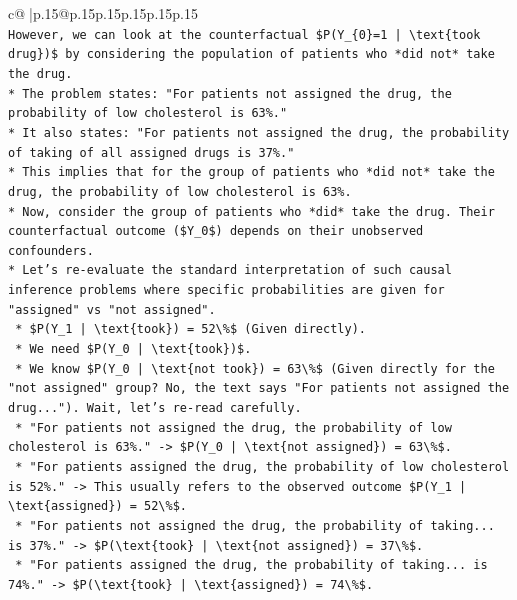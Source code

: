 \documentclass{article}
\begin{document}
{\begin{supertabular}{c@{$\;$}|p{.15\linewidth}@{}p{.15\linewidth}p{.15\linewidth}p{.15\linewidth}p{.15\linewidth}p{.15\linewidth}}
{{{\\ 
\texttt{However, we can look at the counterfactual \$P(Y\_\{0\}=1 | \textbackslash{}text\{took drug\})\$ by considering the population of patients who *did not* take the drug.} \\
\texttt{*   The problem states: "For patients not assigned the drug, the probability of low cholesterol is 63\%."} \\
\texttt{*   It also states: "For patients not assigned the drug, the probability of taking of all assigned drugs is 37\%."} \\
\texttt{*   This implies that for the group of patients who *did not* take the drug, the probability of low cholesterol is 63\%.} \\
\texttt{*   Now, consider the group of patients who *did* take the drug. Their counterfactual outcome (\$Y\_0\$) depends on their unobserved confounders.} \\
\texttt{*   Let's re{-}evaluate the standard interpretation of such causal inference problems where specific probabilities are given for "assigned" vs "not assigned".} \\
\texttt{    *   \$P(Y\_1 | \textbackslash{}text\{took\}) = 52\textbackslash{}\%\$ (Given directly).} \\
\texttt{    *   We need \$P(Y\_0 | \textbackslash{}text\{took\})\$.} \\
\texttt{    *   We know \$P(Y\_0 | \textbackslash{}text\{not took\}) = 63\textbackslash{}\%\$ (Given directly for the "not assigned" group? No, the text says "For patients not assigned the drug..."). Wait, let's re{-}read carefully.} \\
\texttt{    *   "For patients not assigned the drug, the probability of low cholesterol is 63\%." {-}> \$P(Y\_0 | \textbackslash{}text\{not assigned\}) = 63\textbackslash{}\%\$.} \\
\texttt{    *   "For patients assigned the drug, the probability of low cholesterol is 52\%." {-}> This usually refers to the observed outcome \$P(Y\_1 | \textbackslash{}text\{assigned\}) = 52\textbackslash{}\%\$.} \\
\texttt{    *   "For patients not assigned the drug, the probability of taking... is 37\%." {-}> \$P(\textbackslash{}text\{took\} | \textbackslash{}text\{not assigned\}) = 37\textbackslash{}\%\$.} \\
\texttt{    *   "For patients assigned the drug, the probability of taking... is 74\%." {-}> \$P(\textbackslash{}text\{took\} | \textbackslash{}text\{assigned\}) = 74\textbackslash{}\%\$.} \\
}}}
\end{supertabular}}
\end{document}
